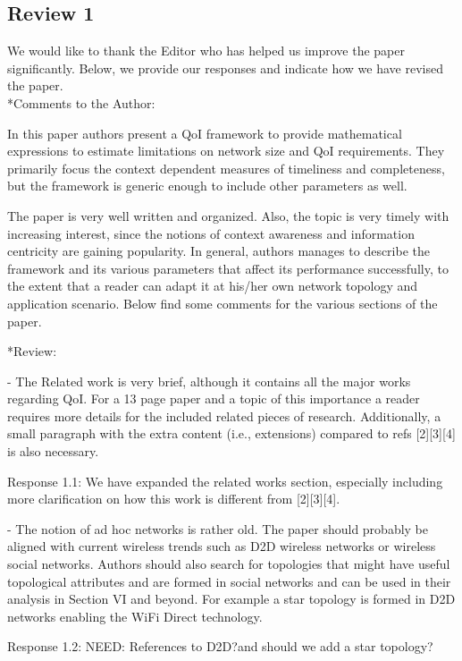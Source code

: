 \documentclass[12pt, letterpaper, onecolumn]{IEEEtran}
\begin{document}
\subsection {Review 1}

{\color {blue}We would like to thank the Editor who has helped us improve the paper significantly. Below, we provide our responses and indicate how we have revised the paper.}\\

\noindent**Comments to the Author:

In this paper authors present a QoI framework to provide mathematical expressions to estimate limitations on network size and QoI requirements. They primarily focus the context dependent measures of timeliness and completeness, but the framework is generic enough to include other parameters as well.

The paper is very well written and organized. Also, the topic is very timely with increasing interest, since the notions of context awareness and information centricity are gaining popularity. In general, authors manages to describe the framework and its various parameters that affect its performance successfully, to the extent that a reader can adapt it at his/her own network topology and application scenario. Below find some comments for the various sections of the paper.

\noindent**Review: 

- The Related work is very brief, although it contains all the major works regarding QoI. For a 13 page paper and a topic of this importance a reader requires more details for the included related pieces of research. Additionally, a small paragraph with the extra content (i.e., extensions) compared to refs [2][3][4] is also necessary.

{\color {blue}Response 1.1: We have expanded the related works section, especially including more clarification on how this work is different from [2][3][4].}

- The notion of ad hoc networks is rather old. The paper should probably be aligned with current wireless trends such as D2D wireless networks or wireless social networks. Authors should also search for topologies that might have useful topological attributes and are formed in social networks and can be used in their analysis in Section VI and beyond. For example a star topology is formed in D2D networks enabling the WiFi Direct technology. 

{\color {blue}Response 1.2: NEED: References to D2D?and should we add a star topology?}
\end{document}
